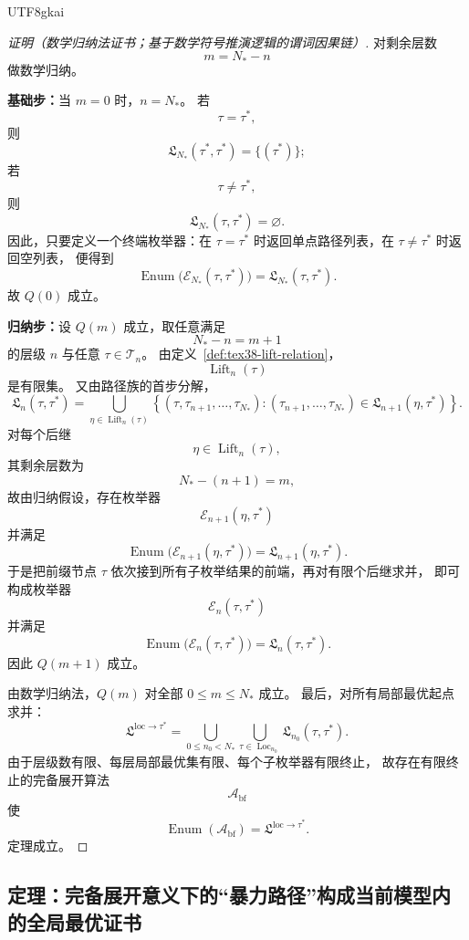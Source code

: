 \documentclass[12pt]{article}
\newcommand{\Lift}{\operatorname{Lift}}
\begin{document}
\begin{CJK*}{UTF8}{gkai}
\begin{proof}[证明（数学归纳法证书；基于数学符号推演逻辑的谓词因果链）]
对剩余层数
\[
  m=N_\ast-n
\]
做数学归纳。

\textbf{基础步：}当 $m=0$ 时，$n=N_\ast$。
若
\[
  \tau=\tau^\ast,
\]
则
\[
  \mathfrak L_{N_\ast}(\tau^\ast,\tau^\ast)=\{(\tau^\ast)\};
\]
若
\[
  \tau\neq\tau^\ast,
\]
则
\[
  \mathfrak L_{N_\ast}(\tau,\tau^\ast)=\varnothing.
\]
因此，只要定义一个终端枚举器：在 $\tau=\tau^\ast$ 时返回单点路径列表，在 $\tau\neq\tau^\ast$ 时返回空列表，
便得到
\[
  \operatorname{Enum}\bigl(\mathcal E_{N_\ast}(\tau,\tau^\ast)\bigr)
  =
  \mathfrak L_{N_\ast}(\tau,\tau^\ast).
\]
故 $Q(0)$ 成立。

\textbf{归纳步：}设 $Q(m)$ 成立，取任意满足
\[
  N_\ast-n=m+1
\]
的层级 $n$ 与任意 $\tau\in\mathcal T_n$。
由定义~\ref{def:tex38-lift-relation}，
\[
  \Lift_n(\tau)
\]
是有限集。
又由路径族的首步分解，
\[
  \mathfrak L_n(\tau,\tau^\ast)
  =
  \bigcup_{\eta\in\Lift_n(\tau)}
  \left\{
    (\tau,\tau_{n+1},\dots,\tau_{N_\ast}):
    (\tau_{n+1},\dots,\tau_{N_\ast})\in
    \mathfrak L_{n+1}(\eta,\tau^\ast)
  \right\}.
\]
对每个后继
\[
  \eta\in\Lift_n(\tau),
\]
其剩余层数为
\[
  N_\ast-(n+1)=m,
\]
故由归纳假设，存在枚举器
\[
  \mathcal E_{n+1}(\eta,\tau^\ast)
\]
并满足
\[
  \operatorname{Enum}\bigl(\mathcal E_{n+1}(\eta,\tau^\ast)\bigr)
  =
  \mathfrak L_{n+1}(\eta,\tau^\ast).
\]
于是把前缀节点 $\tau$ 依次接到所有子枚举结果的前端，再对有限个后继求并，
即可构成枚举器
\[
  \mathcal E_n(\tau,\tau^\ast)
\]
并满足
\[
  \operatorname{Enum}\bigl(\mathcal E_n(\tau,\tau^\ast)\bigr)
  =
  \mathfrak L_n(\tau,\tau^\ast).
\]
因此 $Q(m+1)$ 成立。

由数学归纳法，$Q(m)$ 对全部 $0\le m\le N_\ast$ 成立。
最后，对所有局部最优起点求并：
\[
  \mathfrak L^{\mathrm{loc}\to\tau^\ast}
  =
  \bigcup_{0\le n_0<N_\ast}
  \bigcup_{\tau\in\operatorname{Loc}_{n_0}}
  \mathfrak L_{n_0}(\tau,\tau^\ast).
\]
由于层级数有限、每层局部最优集有限、每个子枚举器有限终止，
故存在有限终止的完备展开算法
\[
  \mathcal A_{\mathrm{bf}}
\]
使
\[
  \operatorname{Enum}(\mathcal A_{\mathrm{bf}})
  =
  \mathfrak L^{\mathrm{loc}\to\tau^\ast}.
\]
定理成立。
\end{proof}

\subsection{定理：完备展开意义下的“暴力路径”构成当前模型内的全局最优证书}
\label{subsec:tex38-smart-bruteforce}


\end{CJK*}
\end{document}

